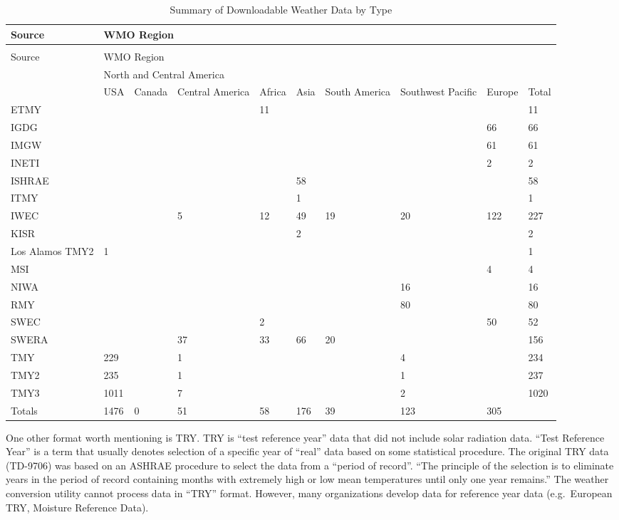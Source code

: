 {\scriptsize
\begin{longtable}[c]{p{0.5in}p{0.5in}p{0.5in}p{0.5in}p{0.5in}p{0.5in}p{0.5in}p{0.5in}p{0.5in}p{0.5in}}
\caption{Summary of Downloadable Weather Data by Type \label{table:summary-of-downloadable-weather-data-by-type}} \tabularnewline
\toprule 
Source & \multicolumn{8}{l}{WMO Region} &  \tabularnewline
\midrule
\endfirsthead

\caption[]{Summary of Downloadable Weather Data by Type} \tabularnewline
\toprule 
Source & \multicolumn{8}{l}{WMO Region} &  \tabularnewline
\midrule
\endhead

 & \multicolumn{3}{l}{North and Central America} &  &  &  &  &  &  \tabularnewline
 & USA & Canada & Central America & Africa & Asia & South America & Southwest Pacific & Europe & Total \tabularnewline
ETMY &  &  &  & 11 &  &  &  &  & 11 \tabularnewline
IGDG &  &  &  &  &  &  &  & 66 & 66 \tabularnewline
IMGW &  &  &  &  &  &  &  & 61 & 61 \tabularnewline
INETI &  &  &  &  &  &  &  & 2 & 2 \tabularnewline
ISHRAE &  &  &  &  & 58 &  &  &  & 58 \tabularnewline
ITMY &  &  &  &  & 1 &  &  &  & 1 \tabularnewline
IWEC &  &  & 5 & 12 & 49 & 19 & 20 & 122 & 227 \tabularnewline
KISR &  &  &  &  & 2 &  &  &  & 2 \tabularnewline
Los Alamos TMY2 & 1 &  &  &  &  &  &  &  & 1 \tabularnewline
MSI &  &  &  &  &  &  &  & 4 & 4 \tabularnewline
NIWA &  &  &  &  &  &  & 16 &  & 16 \tabularnewline
RMY &  &  &  &  &  &  & 80 &  & 80 \tabularnewline
SWEC &  &  &  & 2 &  &  &  & 50 & 52 \tabularnewline
SWERA &  &  & 37 & 33 & 66 & 20 &  &  & 156 \tabularnewline
TMY & 229 &  & 1 &  &  &  & 4 &  & 234 \tabularnewline
TMY2 & 235 &  & 1 &  &  &  & 1 &  & 237 \tabularnewline
TMY3 & 1011 &  & 7 &  &  &  & 2 &  & 1020 \tabularnewline
Totals & 1476 & 0 & 51 & 58 & 176 & 39 & 123 & 305 &  \tabularnewline
\bottomrule
\end{longtable}}

One other format worth mentioning is TRY. TRY is ``test reference year'' data that did not include solar radiation data. ``Test Reference Year'' is a term that usually denotes selection of a specific year of ``real'' data based on some statistical procedure. The original TRY data (TD-9706) was based on an ASHRAE procedure to select the data from a ``period of record''. ``The principle of the selection is to eliminate years in the period of record containing months with extremely high or low mean temperatures until only one year remains.'' The weather conversion utility cannot process data in ``TRY'' format. However, many organizations develop data for reference year data (e.g.~European TRY, Moisture Reference Data).

